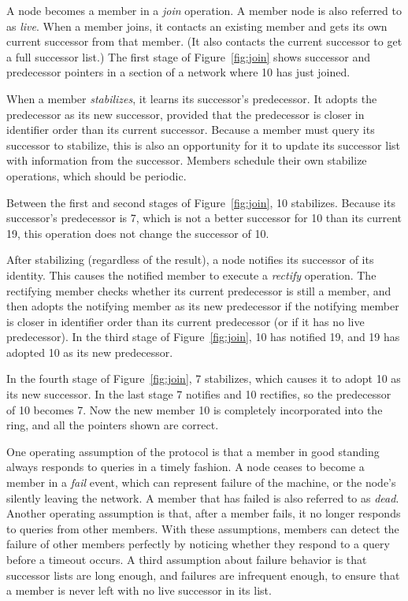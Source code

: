 \documentclass[conference]{IEEEtran}
\begin{document}
A node becomes a member in a {\it join} operation.
A member node is also referred to as {\it live}.
When a member joins, it contacts an existing member and gets its own
current successor from that member.
(It also contacts the current successor to get a full successor list.)
The first stage of Figure~\ref{fig:join} shows successor and predecessor
pointers in a section of a network where 10 has just joined.

When a member {\it stabilizes}, it learns its successor's predecessor.
It adopts the predecessor
as its new successor, provided that the predecessor
is closer in identifier order
than its current successor.
Because a member must query its successor to stabilize, this is also
an opportunity for it to update its successor list with information
from the successor.
Members schedule their own stabilize operations, which should
be periodic.

Between the first and second stages
of Figure~\ref{fig:join}, 10 stabilizes.
Because its successor's predecessor is 7, which is not a better successor
for 10 than its current 19, this operation does not change the successor
of 10.

After stabilizing (regardless of the result),
a node notifies its successor of its identity.
This causes the notified member to execute a {\it rectify} operation.
The rectifying member checks whether its current predecessor is still a
member, and then adopts the notifying member as its new predecessor
if the notifying member
is closer in identifier order than its current predecessor
(or if it has no live predecessor).
In the third stage of Figure~\ref{fig:join},
10 has notified 19, and 19 has adopted 10 as its new predecessor.

In the fourth stage of Figure~\ref{fig:join}, 7 stabilizes, which causes
it to adopt 10 as its new successor.
In the last stage 7 notifies and 10 rectifies, 
so the predecessor of 10 becomes 7.
Now the new member 10 is completely incorporated into the ring, and all
the pointers shown are correct.

One operating
assumption of the protocol is that a member in good standing always
responds to queries in a timely fashion.
A node ceases to become a member in a {\it fail} event, which can
represent failure of the machine, or the node's
silently leaving the network.
A member that has failed is also referred to as {\it dead}.
Another operating assumption is that, after a member fails, it no longer
responds to queries from other members.
With these assumptions, members can detect the failure of other members
perfectly by noticing whether they respond to a query before a timeout
occurs.
A third assumption about failure behavior is that
successor lists are long enough, and failures are infrequent enough,
to ensure that a
member is never left with no live successor in its list.
\end{document}
